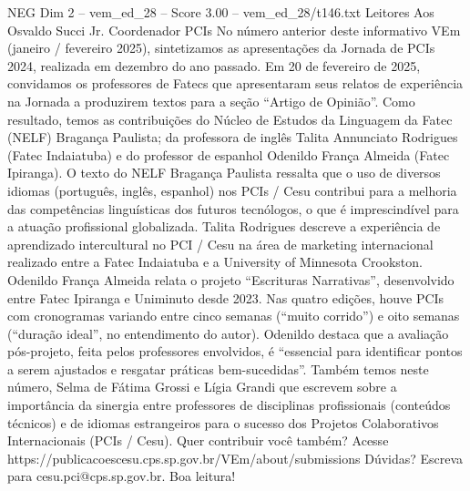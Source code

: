 \begin{textsample}{NEG Dim 2 – vem\_ed\_28 – Score 3.00 – vem\_ed\_28/t146.txt}  \label{ex:f2_neg_115}
Leitores Aos Osvaldo Succi Jr.
Coordenador PCIs No número anterior deste informativo VEm (janeiro / fevereiro 2025), sintetizamos as apresentações da Jornada de PCIs 2024, realizada em dezembro do ano passado.
Em 20 de fevereiro de 2025, convidamos os professores de Fatecs que apresentaram seus relatos de experiência na Jornada a produzirem textos para a seção “Artigo de Opinião”.
Como resultado, temos as contribuições do Núcleo de Estudos da Linguagem da Fatec (NELF) Bragança Paulista; da professora de inglês Talita Annunciato Rodrigues (Fatec Indaiatuba) e do professor de espanhol Odenildo França Almeida (Fatec Ipiranga).
O texto do NELF Bragança Paulista ressalta que o uso de diversos idiomas (português, inglês, espanhol) nos PCIs / Cesu contribui para a melhoria das competências linguísticas dos futuros tecnólogos, o que é imprescindível para a atuação profissional globalizada.
Talita Rodrigues descreve a experiência de aprendizado intercultural no PCI / Cesu na área de marketing internacional realizado entre a Fatec Indaiatuba e a University of Minnesota Crookston.
Odenildo França Almeida relata o projeto “Escrituras Narrativas”, desenvolvido entre Fatec Ipiranga e Uniminuto desde 2023.
Nas quatro edições, houve PCIs com cronogramas variando entre cinco semanas (“muito corrido”) e oito semanas (“duração ideal”, no entendimento do autor).
Odenildo destaca que a avaliação pós-projeto, feita pelos professores envolvidos, é “essencial para identificar pontos a serem ajustados e resgatar práticas bem-sucedidas”.
Também temos neste número, Selma de Fátima Grossi e Lígia Grandi que escrevem sobre a importância da sinergia entre professores de disciplinas profissionais (conteúdos técnicos) e de idiomas estrangeiros para o sucesso dos Projetos Colaborativos Internacionais (PCIs / Cesu).
Quer contribuir você também?
Acesse https://publicacoescesu.cps.sp.gov.br/VEm/about/submissions Dúvidas?
Escreva para cesu.pci@cps.sp.gov.br.
Boa leitura!

\end{textsample}
